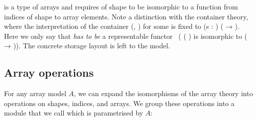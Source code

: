  is a type of arrays and  requires 
 of shape  to be isomorphic to a function
from indices of shape  to array elements.
Note a distinction with the container theory, where
the interpretation of the container (, ) for some 
is fixed to  (s : ) (  → ).
Here we only say that  \emph{has to be} a
representable functor~\citep{SB_1958-1960__5__369_0}
(\ie{} ( ) is isomorphic to (  → )).
The concrete storage layout is left to the model.

\subsection{\label{sec:arrop}Array operations}

For any array model $A$, we can expand the isomorphisms of
the array theory into operations on shapes, indices, and arrays.
We group these operations into a module that we call 
which is parametrised by $A$:
